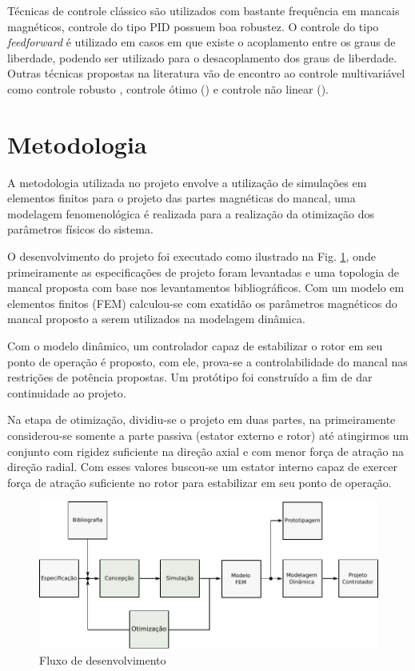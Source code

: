 Técnicas de controle clássico são utilizados com bastante frequência em mancais magnéticos, controle do tipo PID  \citep{Tezuka2013} possuem boa robustez. O controle  do tipo \textit{feedforward} é utilizado em casos em que existe o acoplamento entre os graus de liberdade, podendo ser utilizado para o desacoplamento dos graus de liberdade. Outras técnicas propostas na literatura vão de encontro ao controle multivariável como controle robusto \citep{Jimenez-Lizafrraga2007}, controle ótimo (\citep{Schuhmann2012}) e controle não linear (\citep{Rundell1996}).

\section{Metodologia}

A metodologia utilizada no projeto envolve a utilização de simulações em elementos finitos para o projeto das partes magnéticas do mancal, uma modelagem fenomenológica é realizada para a realização da otimização dos parâmetros físicos do sistema. 

O desenvolvimento do projeto foi executado como ilustrado na Fig. \ref{fig:metodologia:fluxo:dev}, onde primeiramente as especificações de projeto foram levantadas e uma topologia de mancal proposta com base nos levantamentos bibliográficos. Com um modelo em elementos finitos (FEM) calculou-se com exatidão os parâmetros magnéticos do mancal proposto a serem utilizados na modelagem dinâmica.

Com o modelo dinâmico, um controlador capaz de estabilizar o rotor em seu ponto de operação é proposto, com ele, prova-se a controlabilidade do mancal nas restrições de potência propostas. Um protótipo foi construído a fim de dar continuidade ao projeto.

Na etapa de otimização, dividiu-se o projeto em duas partes, na primeiramente considerou-se somente a parte passiva (estator externo e rotor) até atingirmos um conjunto com rigidez suficiente na direção axial e com menor força de atração na direção radial. Com esses valores buscou-se um estator interno capaz de exercer força de atração suficiente no rotor para estabilizar em seu ponto de operação.
 
\begin{figure}[th!]
	\centering
	\includegraphics[width=1\linewidth]{Figs/metodologia_fluxo_dev}
	\caption{Fluxo de desenvolvimento}
	\label{fig:metodologia:fluxo:dev}
\end{figure}
 
